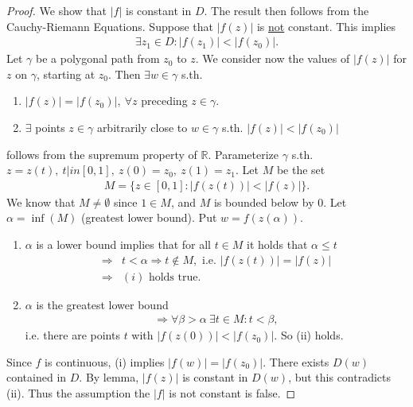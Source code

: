 \documentclass[12pt, a4paper]{article}
\theoremstyle{plain}
\theoremstyle{definition}
\begin{document}
			\begin{proof}
				We show that $|f|$ is constant in $D$. The result then follows from the Cauchy-Riemann Equations. Suppose that $|f(z)|$ is \underline{not} constant. This implies
				\begin{align*}
					\exists z_1\in D: |f(z_1)|<|f(z_0)|.
				\end{align*}
				Let $\gamma$ be a polygonal path from $z_0$ to $z$. We consider now the values of $|f(z)|$ for $z$ on $\gamma$, starting at $z_0$. Then $\exists w\in \gamma$ s.th.
				\begin{enumerate}[label=(\roman*)]
					\item $|f(z)| = |f(z_0)|,\:\forall z$ preceding $z\in \gamma$.
					\item $\exists$ points $z\in \gamma$ arbitrarily close to $w\in \gamma$ s.th. $|f(z)|<|f(z_0)|$
				\end{enumerate}
				follows from the supremum property of $\mathbb{R}$. Parameterize $\gamma$ s.th. $z=z(t),\:t|in[0,1],\:z(0)=z_0,\:z(1)=z_1$. Let $M$ be the set
				\begin{align*}
				 	M=\{z\in[0,1]: |f(z(t))|<|f(z)|\}.
				 \end{align*} 
				 We know that $M\not=\emptyset$ since $1\in M$, and $M$ is bounded below by 0. Let $\alpha=\inf(M)$ (greatest lower bound). Put $w=f(z(\alpha))$.
				 \begin{enumerate}[label=(\roman*)]
				 	\item $\alpha$ is a lower bound implies that for all $t\in M$ it holds that $\alpha\le t$
				 	\begin{align*}
				 		\Rightarrow &t<\alpha \Rightarrow t\not\in M,\text{ i.e. } |f(z(t))|=|f(z)|\\
				 		\Rightarrow &(i)\text{ holds true}.
				 	\end{align*}

				 	\item $\alpha$ is the greatest lower bound
				 	\begin{align*}
				 		\Rightarrow \forall \beta>\alpha\:\exists t\in M: t<\beta,
				 	\end{align*}
				 	i.e. there are points $t$ with $|f(z(0))|<|f(z_0)|$. So (ii) holds.
				 \end{enumerate}
				 Since $f$ is continuous, (i) implies  $|f(w)|=|f(z_0)|$. There exists $D(w)$ contained in $D$. By lemma, $|f(z)|$ is constant in $D(w)$, but this contradicts (ii). Thus the assumption the $|f|$ is not constant is false.
			\end{proof}
\end{document}
